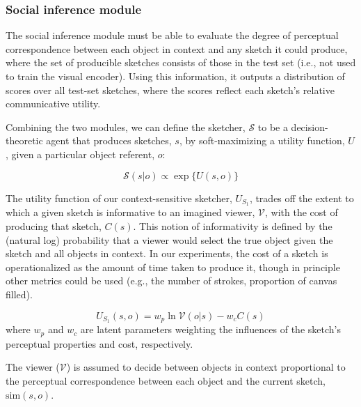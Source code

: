\documentclass[9pt,twocolumn,twoside]{pnas-new}
\newcommand{\mwu}[1]{{\color{green}{[mwu: #1]}}}
\begin{document}
{\mwu{We split the datasets of images and sketches into three groups: a training set, a validation set, and a test set. Post training, we use the parameters from the epoch with the highest validation accuracy i.e. early stopping ADD CITATION. During training, the model never sees any test data.}

\subsubsection*{Social inference module}

The social inference module must be able to evaluate the degree of perceptual correspondence between each object in context and any sketch it could produce, where the set of producible sketches consists of those in the test set (i.e., not used to train the visual encoder). Using this information, it outputs a distribution of scores over all test-set sketches, where the scores reflect each sketch's relative communicative utility.

Combining the two modules, we can define the sketcher, $\mathcal{S}$ to be a decision-theoretic agent that produces sketches, $s$, by soft-maximizing a utility function, $U$, given a particular object referent, $o$:

\begin{equation}
\mathcal{S}(s|o) \propto \exp\{{U(s,o)\}}
\end{equation}

The utility function of our context-sensitive sketcher, $U_{S_1}$, trades off the extent to which a given sketch is informative to an imagined viewer, $\mathcal{V}$, with the cost of producing that sketch, $C(s)$. This notion of informativity is defined by the (natural log) probability that a viewer would select the true object given the sketch and all objects in context. In our experiments, the cost of a sketch is operationalized as the amount of time taken to produce it, though in principle other metrics could be used (e.g., the number of strokes, proportion of canvas filled).

\begin{equation} \label{sketcher_utility}
U_{S_1}(s, o) = w_p \ln \mathcal{V}(o|s) - w_c C(s)
\end{equation}
where $w_p$ and $w_c$ are latent parameters weighting the influences of the sketch's perceptual properties and cost, respectively.

The viewer ($\mathcal{V}$) is assumed to decide between objects in context proportional to the perceptual correspondence between each object and the current sketch, $\textrm{sim}(s, o)$.

}
\end{document}
